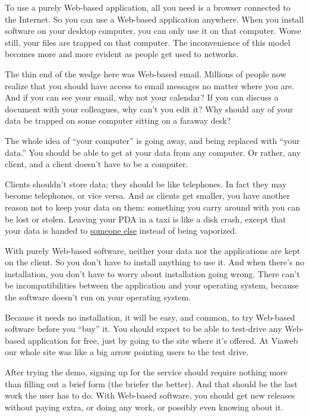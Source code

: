 \documentclass[12pt]{book}
\begin{document}
To use a purely Web-based application, all you need is a browser
connected to the Internet. So you can use a Web-based application
anywhere. When you install software on your desktop computer, you can
only use it on that computer. Worse still, your files are trapped on
that computer. The inconvenience of this model becomes more and more
evident as people get used to networks.

The thin end of the wedge here was Web-based email. Millions of people
now realize that you should have access to email messages no matter
where you are. And if you can see your email, why not your calendar? If
you can discuss a document with your colleagues, why can't you edit it?
Why should any of your data be trapped on some computer sitting on a
faraway desk?

The whole idea of ``your computer'' is going away, and being replaced
with ``your data.'' You should be able to get at your data from any
computer. Or rather, any client, and a client doesn't have to be a
computer.

Clients shouldn't store data; they should be like telephones. In fact
they may become telephones, or vice versa. And as clients get smaller,
you have another reason not to keep your data on them: something you
carry around with you can be lost or stolen. Leaving your PDA in a taxi
is like a disk crash, except that your data is handed to
\href{http://news.zdnet.co.uk/business/0,39020645,2077931,00.htm}{someone
else} instead of being vaporized.

With purely Web-based software, neither your data nor the applications
are kept on the client. So you don't have to install anything to use it.
And when there's no installation, you don't have to worry about
installation going wrong. There can't be incompatibilities between the
application and your operating system, because the software doesn't run
on your operating system.

Because it needs no installation, it will be easy, and common, to try
Web-based software before you ``buy'' it. You should expect to be able
to test-drive any Web-based application for free, just by going to the
site where it's offered. At Viaweb our whole site was like a big arrow
pointing users to the test drive.

After trying the demo, signing up for the service should require nothing
more than filling out a brief form (the briefer the better). And that
should be the last work the user has to do. With Web-based software, you
should get new releases without paying extra, or doing any work, or
possibly even knowing about it.
\end{document}
